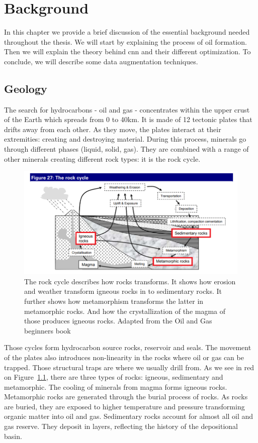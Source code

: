 \chapter{Background}
\label{chp:background}

In this chapter we provide a brief discussion of the essential background needed throughout the thesis. We will start by explaining the process of oil formation. Then we will explain the theory behind \gls{cnn} and their different optimization. To conclude, we will describe some data augmentation techniques.


\section{Geology}
The search for hydrocarbons - oil and gas - concentrates within the upper crust of the Earth which spreads from 0 to 40km. It is made of 12 tectonic plates that drifts away from each other. As they move, the plates interact at their extremities: creating and destroying material. During this process, minerals go through different phases (liquid, solid, gas). They are combined with a range of other minerals creating different rock types: it is the rock cycle. 
	\begin{figure}[!htp]
    \centering
        \includegraphics[width=1\textwidth]{figures/02-rock-cycle}
        \caption[The rock cycle]{The rock cycle describes how rocks transforms. It shows how erosion and weather transform igneous rocks in to sedimentary rocks. It further shows how metamorphism transforms the latter in metamorphic rocks. And how the crystallization of the magma of those produces igneous rocks. Adapted from the Oil and Gas beginners book \cite{oilbegin} }\label{fig:rock-cycle}
    \end{figure}

Those cycles form hydrocarbon source rocks, reservoir and seals. The movement of the plates also introduces non-linearity in the rocks where oil or gas can be trapped. Those structural traps are where we usually drill from. As we see in red on Figure~\ref{fig:rock-cycle}, there are three types of rocks: igneous, sedimentary and metamorphic. The cooling of minerals from magma  forms  igneous rocks. Metamorphic rocks are generated through  the burial process of rocks. As rocks are buried, they are exposed to higher temperature and pressure transforming organic matter into oil and gas. Sedimentary rocks account for almost all oil and gas reserve. They deposit in layers, reflecting the history of the depositional basin.


